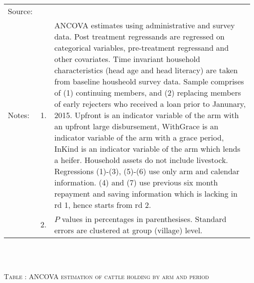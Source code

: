 \begin{minipage}[t]{14cm}
  \setlength{\baselineskip}{8pt}
  \renewcommand{\arraystretch}{.55}
  \hfil{}\\
\renewcommand{\arraystretch}{.8}
\setlength{\tabcolsep}{1pt} \begin{tabular}{>{\hfill\scriptsize}p{1cm}<{}>{\hfill\scriptsize}p{.25cm}<{}>{\scriptsize}p{12cm}<{\hfill}} 
Source:& \multicolumn{2}{l}{\scriptsize Estimated with GUK administrative and survey data.}\\
Notes: & 1. & ANCOVA estimates using administrative and survey data. Post treatment regressands are regressed on categorical variables, pre-treatment regressand and other covariates. Time invariant household characteristics (head age and head literacy) are taken from baseline housheold survey data. Sample comprises of (1) continuing members, and (2) replacing members of early rejecters who received a loan prior to Janunary, 2015.  \textsf{Upfront} is an indicator variable of the arm with an upfront large disbursement, \textsf{WithGrace} is an indicator variable of the arm with a grace period, \textsf{InKind} is an indicator variable of the arm which lends a heifer. Household assets do not include livestock. Regressions (1)-(3), (5)-(6) use only arm and calendar information. (4) and (7) use previous six month repayment and saving information which is lacking in rd 1, hence starts from rd 2.\\
& 2. &  $P$ values in percentages in parenthesises. Standard errors are clustered at group (village) level. %
 \end{tabular}
\end{minipage} \\\\\hspace{-1cm}\begin{minipage}[t]{14cm} \hfil\textsc{\normalsize Table \thetable: ANCOVA estimation of cattle holding by arm and period\label{tab ANCOVA cow time varying}}\\ \setlength{\tabcolsep}{1pt}
  \setlength{\baselineskip}{8pt}
  \renewcommand{\arraystretch}{.55}
  \hfil\begin{tikzpicture}

\end{tikzpicture}
\end{minipage}

